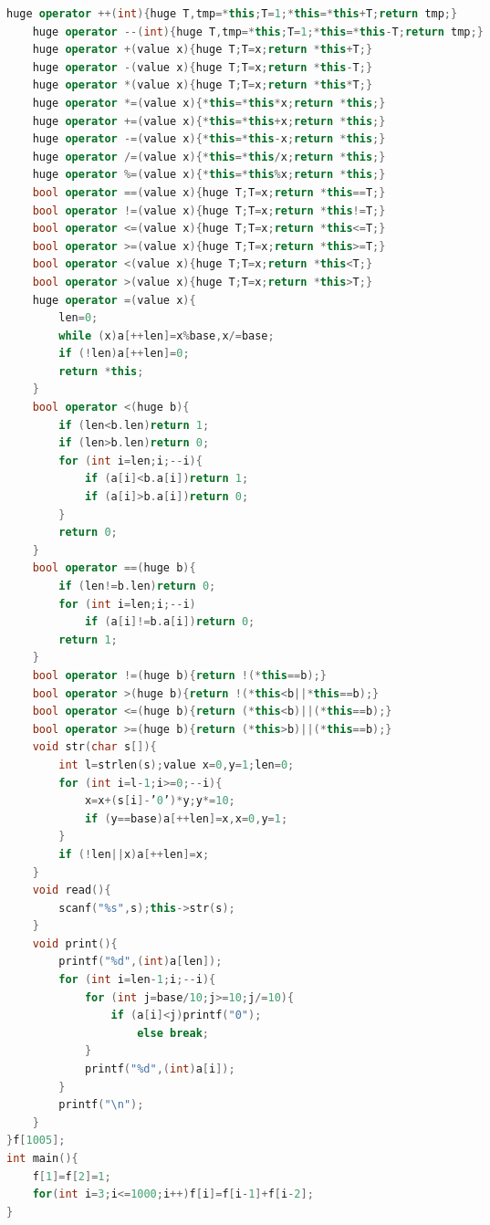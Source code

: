 \documentclass{article}
\begin{document}
\begin{CJK}{UTF8}{song}
\begin{lstlisting}[language=C++]
	huge operator ++(int){huge T,tmp=*this;T=1;*this=*this+T;return tmp;}
	huge operator --(int){huge T,tmp=*this;T=1;*this=*this-T;return tmp;}
	huge operator +(value x){huge T;T=x;return *this+T;}
	huge operator -(value x){huge T;T=x;return *this-T;}
	huge operator *(value x){huge T;T=x;return *this*T;}
	huge operator *=(value x){*this=*this*x;return *this;}
	huge operator +=(value x){*this=*this+x;return *this;}
	huge operator -=(value x){*this=*this-x;return *this;}
	huge operator /=(value x){*this=*this/x;return *this;}
	huge operator %=(value x){*this=*this%x;return *this;}
	bool operator ==(value x){huge T;T=x;return *this==T;}
	bool operator !=(value x){huge T;T=x;return *this!=T;}
	bool operator <=(value x){huge T;T=x;return *this<=T;}
	bool operator >=(value x){huge T;T=x;return *this>=T;}
	bool operator <(value x){huge T;T=x;return *this<T;}
	bool operator >(value x){huge T;T=x;return *this>T;}
	huge operator =(value x){
		len=0;
		while (x)a[++len]=x%base,x/=base;
		if (!len)a[++len]=0;
		return *this;
	}
	bool operator <(huge b){
		if (len<b.len)return 1;
		if (len>b.len)return 0;
		for (int i=len;i;--i){
			if (a[i]<b.a[i])return 1;
			if (a[i]>b.a[i])return 0;
		}
		return 0;
	}
	bool operator ==(huge b){
		if (len!=b.len)return 0;
		for (int i=len;i;--i)
			if (a[i]!=b.a[i])return 0;
		return 1;
	}
	bool operator !=(huge b){return !(*this==b);}
	bool operator >(huge b){return !(*this<b||*this==b);}
	bool operator <=(huge b){return (*this<b)||(*this==b);}
	bool operator >=(huge b){return (*this>b)||(*this==b);}
	void str(char s[]){
		int l=strlen(s);value x=0,y=1;len=0;
		for (int i=l-1;i>=0;--i){
			x=x+(s[i]-’0’)*y;y*=10;
			if (y==base)a[++len]=x,x=0,y=1;
		}
		if (!len||x)a[++len]=x;
	}
	void read(){
		scanf("%s",s);this->str(s);
	}
	void print(){
		printf("%d",(int)a[len]);
		for (int i=len-1;i;--i){
			for (int j=base/10;j>=10;j/=10){
				if (a[i]<j)printf("0");
					else break;
			}
			printf("%d",(int)a[i]);
		}
		printf("\n");
	}
}f[1005];
int main(){
	f[1]=f[2]=1;
	for(int i=3;i<=1000;i++)f[i]=f[i-1]+f[i-2];
}
\end{lstlisting}
\end{CJK}
\end{document}
